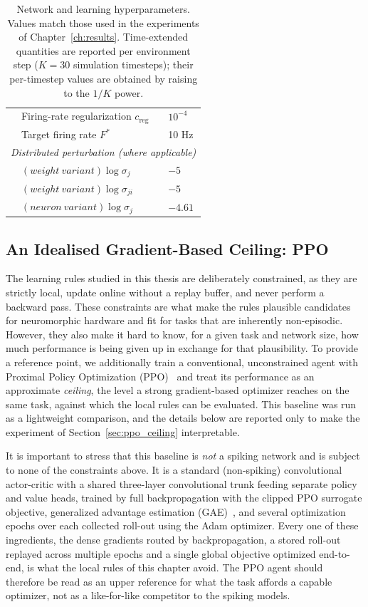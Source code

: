\begin{table}[h!]
\begin{tabular}{@{}l l l@{}}
& Firing-rate regularization $c_{\mathrm{reg}}$ & $10^{-4}$ \\
& Target firing rate $F^{*}$ & 10 Hz \\
\midrule
\multicolumn{3}{l}{\textit{Distributed perturbation (where applicable)}} \\
& $(weight\ variant)\log \sigma_{j}$ & $-5$ \\
& $(weight\ variant)\log \sigma_{ji}$ & $-5$ \\
& $(neuron\ variant)\log \sigma_{j}$ & $-4.61$ \\
\bottomrule
\end{tabular}
\caption{Network and learning hyperparameters. Values match
those used in the experiments of
Chapter~\ref{ch:results}. Time-extended quantities are
reported per environment step ($K=30$ simulation timesteps);
their per-timestep values are obtained by raising to the
$1/K$ power.}
\label{tab:hyperparams}
\end{table}

\subsection{An Idealised Gradient-Based Ceiling: PPO}
\label{subsec:ppo_ceiling}

The learning rules studied in this thesis are deliberately constrained, as they
are strictly local, update online without a replay buffer, and never perform
a backward pass. These constraints are what make the rules plausible
candidates for neuromorphic hardware and fit for tasks that are inherently non-episodic. However, they also make it hard to know, for
a given task and network size, how much performance is being given up in
exchange for that plausibility. To provide a reference point, we additionally
train a conventional, unconstrained agent with Proximal Policy Optimization
(PPO)~\citep{schulman2017ppo} and treat its performance as an approximate
\emph{ceiling}, the level a strong gradient-based optimizer reaches on the
same task, against which the local rules can be evaluated. This baseline was run
as a lightweight comparison, and the
details below are reported only to make the experiment of
Section~\ref{sec:ppo_ceiling} interpretable.

It is important to stress that this baseline is \emph{not} a spiking network
and is subject to none of the constraints above. It is a standard
(non-spiking) convolutional actor-critic with a shared three-layer
convolutional trunk feeding separate policy and value heads, trained by full
backpropagation with the clipped PPO surrogate objective, generalized
advantage estimation (GAE)~\citep{schulman2016gae}, and several optimization
epochs over each collected roll-out using the Adam optimizer. Every one of
these ingredients, the dense gradients routed by backpropagation, a stored
roll-out replayed across multiple epochs and a single global objective
optimized end-to-end, is what the local rules of this chapter avoid. The PPO agent should therefore be read as an upper reference for what
the task affords a capable optimizer, not as a like-for-like competitor to
the spiking models.

